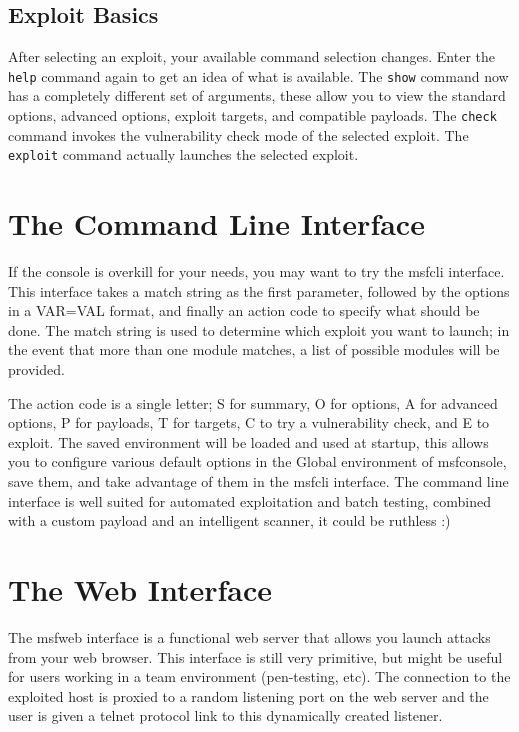 \documentclass{report}
\begin{document}
    \subsection{Exploit Basics}
    \label{CONSOLE-SEL}
\par
After selecting an exploit, your available command selection changes. Enter the 
\texttt{help} command again to get an idea of what is available. The
\texttt{show} command now has a completely different set of arguments, these
allow you to view the standard options, advanced options, exploit targets, and
compatible payloads. The  \texttt{check} command invokes the vulnerability check
mode of the selected exploit. The  \texttt{exploit} command actually launches
the selected exploit.  

    \section{The Command Line Interface}
    \label{STARTED-CLI}
\par
If the console is overkill for your needs, you may want to try the msfcli
interface. This interface takes a match string as the first parameter, followed
by the options in a VAR=VAL format, and finally an action code to specify what
should be done. The match string is used to determine which exploit you want to
launch; in the event that more than one module matches, a list of possible
modules will be provided. 

\par
The action code is a single letter; S for summary, O for options, A for advanced
options, P for payloads, T for targets, C to try a vulnerability check, and E to
exploit. The saved environment will be loaded and used at startup, this allows
you to configure various default options in the Global environment of
msfconsole, save them, and take advantage of them in the msfcli interface.  
The command line interface is well suited for automated exploitation and batch
testing, combined with a custom payload and an intelligent scanner, it could be
ruthless :) 


    \section{The Web Interface}
    \label{STARTED-WEB}
\par
The msfweb interface is a functional web server that allows you launch attacks
from your web browser. This interface is still very primitive, but might be
useful for users working in a team environment (pen-testing, etc). The
connection to the exploited host is proxied to a random listening port on the
web server and the user is given a telnet protocol link to this dynamically
created listener.
\end{document}
